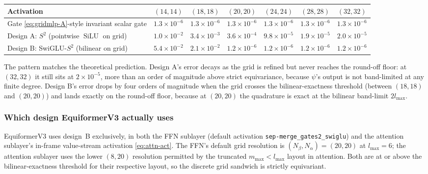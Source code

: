\documentclass[11pt,a4paper]{article}
\DeclareMathOperator{\SiLU}{SiLU}
\newcommand{\Sph}{S^2}
\newcommand{\lmax}{l_{\max}}
\newcommand{\mmax}{m_{\max}}
\theoremstyle{plain}
\theoremstyle{definition}
\theoremstyle{remark}
\begin{document}
\begin{center}
    \begin{tabular}{l|cccccc}
        \hline
        Activation                                            & $(14,14)$              & $(18,18)$              & $(20,20)$              & $(24,24)$              & $(28,28)$              & $(32,32)$              \\
        \hline
        Gate \eqref{eq:gridmlp-A}-style invariant scalar gate & $1.3\!\times\!10^{-6}$ & $1.3\!\times\!10^{-6}$ & $1.3\!\times\!10^{-6}$ & $1.3\!\times\!10^{-6}$ & $1.3\!\times\!10^{-6}$ & $1.3\!\times\!10^{-6}$ \\
        Design A: $S^2$ (pointwise $\SiLU$ on grid)           & $1.0\!\times\!10^{-2}$ & $3.4\!\times\!10^{-3}$ & $3.6\!\times\!10^{-4}$ & $9.8\!\times\!10^{-5}$ & $1.9\!\times\!10^{-5}$ & $2.0\!\times\!10^{-5}$ \\
        Design B: SwiGLU-$\Sph$ (bilinear on grid)            & $5.4\!\times\!10^{-2}$ & $2.1\!\times\!10^{-2}$ & $1.2\!\times\!10^{-6}$ & $1.2\!\times\!10^{-6}$ & $1.2\!\times\!10^{-6}$ & $1.2\!\times\!10^{-6}$ \\
        \hline
    \end{tabular}
\end{center}

The pattern matches the theoretical prediction. Design A's error decays as the
grid is refined but never reaches the round-off floor: at $(32,32)$ it still
sits at $2\times 10^{-5}$, more than an order of magnitude above strict
equivariance, because $\psi$'s output is not band-limited at any finite degree.
Design B's error drops by four orders of magnitude when the grid crosses the
bilinear-exactness threshold (between $(18,18)$ and $(20,20)$) and lands
exactly on the round-off floor, because at $(20,20)$ the quadrature is exact at
the bilinear band-limit $2\lmax$.

\subsubsection*{Which design EquiformerV3 actually uses}

EquiformerV3 uses design~B exclusively, in both the FFN sublayer (default
activation \texttt{sep-merge\_gates2\_swiglu}) and the attention sublayer's
in-frame value-stream activation \eqref{eq:attn-act}. The FFN's default grid
resolution is $(N_\beta,N_\alpha)=(20,20)$ at $\lmax=6$; the attention sublayer
uses the lower $(8,20)$ resolution permitted by the truncated $\mmax<\lmax$
layout in attention. Both are at or above the bilinear-exactness threshold for
their respective layout, so the discrete grid sandwich is strictly equivariant.
\end{document}

